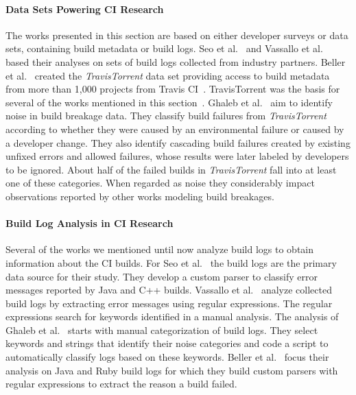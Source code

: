 \documentclass[\myrootdir/main.tex]{subfiles}
\begin{document}
\paragraph{Data Sets Powering CI Research}
The works presented in this section are based on either developer surveys or data sets, containing build metadata or build logs.
Seo et al.~\cite{seo2014programmers} and Vassallo et al.~\cite{vassallo2017a-tale} based their analyses on sets of build logs collected from industry partners.
Beller et al.~\cite{beller2017travistorrent} created the \emph{TravisTorrent} data set providing access to build metadata from more than 1,000 projects from Travis CI~\cite{travisci2019webpage}.
TravisTorrent was the basis for several of the works mentioned in this section~\cite{rausch2017empirical,zampetti2017open,vassallo2017a-tale,beller2017oops}.
Ghaleb et al.~\cite{ghaleb2019studying} aim to identify noise in build breakage data.
They classify build failures from \emph{TravisTorrent} according to whether they were caused by an environmental failure or caused by a developer change.
They also identify cascading build failures created by existing unfixed errors and allowed failures, whose results were later labeled by developers to be ignored.
About half of the failed builds in \emph{TravisTorrent} fall into at least one of these categories.
When regarded as noise they considerably impact observations reported by other works modeling build breakages.

\paragraph{Build Log Analysis in CI Research}
Several of the works we mentioned until now analyze build logs to obtain information about the CI builds. 
For Seo et al.~\cite{seo2014programmers} the build logs are the primary data source for their study.
They develop a custom parser to classify error messages reported by Java and C++ builds. 
Vassallo et al.~\cite{vassallo2017a-tale} analyze collected build logs by extracting error messages using regular expressions.
The regular expressions search for keywords identified in a manual analysis.
The analysis of Ghaleb et al.~\cite{ghaleb2019studying} starts with manual categorization of build logs.
They select keywords and strings that identify their noise categories and code a script to automatically classify logs based on these keywords.
Beller et al.~\cite{beller2017oops} focus their analysis on Java and Ruby build logs for which they build custom parsers with regular expressions to extract the reason a build failed.
\end{document}
